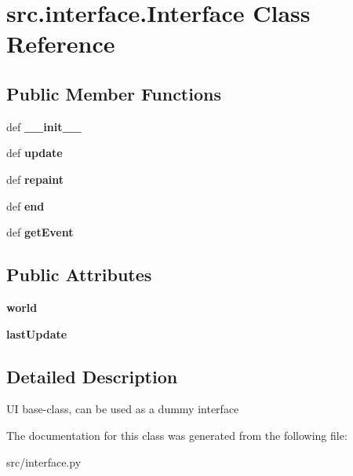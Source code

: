 \hypertarget{classsrc_1_1interface_1_1_interface}{\section{src.\-interface.\-Interface \-Class \-Reference}
\label{classsrc_1_1interface_1_1_interface}
}
\subsection*{\-Public \-Member \-Functions}
\begin{DoxyCompactItemize}
\item 
\hypertarget{classsrc_1_1interface_1_1_interface_ada1c3a225225626675df15f61d113559}{def {\bfseries \-\_\-\-\_\-init\-\_\-\-\_\-}}\label{classsrc_1_1interface_1_1_interface_ada1c3a225225626675df15f61d113559}

\item 
\hypertarget{classsrc_1_1interface_1_1_interface_a56fcf21535627c98870d5ca933fe7ddb}{def {\bfseries update}}\label{classsrc_1_1interface_1_1_interface_a56fcf21535627c98870d5ca933fe7ddb}

\item 
\hypertarget{classsrc_1_1interface_1_1_interface_aadda30cb84c120e7ba0c781d18859f7c}{def {\bfseries repaint}}\label{classsrc_1_1interface_1_1_interface_aadda30cb84c120e7ba0c781d18859f7c}

\item 
\hypertarget{classsrc_1_1interface_1_1_interface_affdfa9bd62cfe35c63cbc070136ef103}{def {\bfseries end}}\label{classsrc_1_1interface_1_1_interface_affdfa9bd62cfe35c63cbc070136ef103}

\item 
\hypertarget{classsrc_1_1interface_1_1_interface_ab15aafe11ab68ed033fc2c11713a99bf}{def {\bfseries get\-Event}}\label{classsrc_1_1interface_1_1_interface_ab15aafe11ab68ed033fc2c11713a99bf}

\end{DoxyCompactItemize}
\subsection*{\-Public \-Attributes}
\begin{DoxyCompactItemize}
\item 
\hypertarget{classsrc_1_1interface_1_1_interface_ad653ebd1abc974f923316aa1be5b4da0}{{\bfseries world}}\label{classsrc_1_1interface_1_1_interface_ad653ebd1abc974f923316aa1be5b4da0}

\item 
\hypertarget{classsrc_1_1interface_1_1_interface_ac520185c5c891a4a5caefa018153f040}{{\bfseries last\-Update}}\label{classsrc_1_1interface_1_1_interface_ac520185c5c891a4a5caefa018153f040}

\end{DoxyCompactItemize}


\subsection{\-Detailed \-Description}
\begin{DoxyVerb}UI base-class, can be used as a dummy interface \end{DoxyVerb}
 

\-The documentation for this class was generated from the following file\-:\begin{DoxyCompactItemize}
\item 
src/interface.\-py\end{DoxyCompactItemize}
